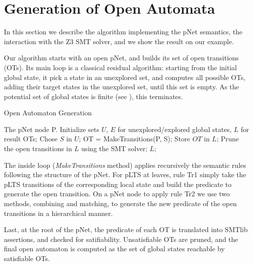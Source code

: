 \documentclass{lncs/llncs}
\begin{document}
\section{Generation of Open Automata}
\label{section:implementation}
In this section we describe the algorithm implementing the pNet
semantics, the interaction with the Z3 SMT solver, and we show the
result on our  example.

Our algorithm starts with an open pNet, and builds its set of open
transitions (OTs). Its main loop is a classical residual algorithm: starting
from the initial global state, it pick a state in an unexplored set, and
computes all possible OTs, adding their target states in the
unexplored set, until this set is empty. As the potential set of
global states is finite (see \cite{henrio:Forte2016}), this terminates.

\begin{algorithm}[h]
  \caption{Open Automaton Generation}
  \label{alg1}
\begin{algorithmic}[1]
\Require The pNet node P.
\State Initialize sets $U$, $E$ for unexplored/explored global states, $L$ for result OTs;
	\State Chose $S$ in $U$;
	\State OT = MakeTransitions(P, S);
        \State Store $OT$ in $L$; 
	\EndFor
\EndWhile
\State Prune the open transitions in $L$ using the SMT solver;
\State \Return $L$;

\end{algorithmic}  
\end{algorithm}

The inside loop (\emph{MakeTransitions} method) applies recursively
the semantic rules following the structure of the pNet. 
For pLTS at leaves, rule Tr1 simply take the pLTS transitions of the
corresponding local state and build the predicate to generate the
open transition. 
On a pNet node to apply rule Tr2 we use two methods, combining and
matching, to generate the new predicate of the open transitions in a
hierarchical manner.

Last, at the root of the pNet, the predicate of each OT is translated
into SMTlib assertions, and checked for satifiability. Unsatisfiable
OTs are pruned, and the final open automaton is computed as the set of
global states reachable by satisfiable OTs. 
\end{document}
